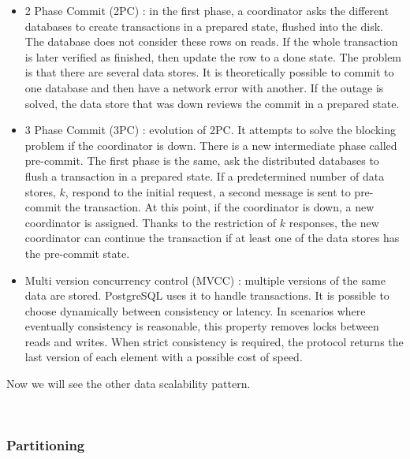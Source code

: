 \documentclass[12pt,english]{article} %
\begin{document}
\begin{itemize}
    \item 2 Phase Commit (2PC) \cite{distributed-transactions-2pc}: in the first phase, a coordinator asks the different databases to create transactions in a prepared state, flushed into the disk.
    The database does not consider these rows on reads.
    If the whole transaction is later verified as finished, then update the row to a done state.
    The problem is that there are several data stores.
    It is theoretically possible to commit to one database and then have a network error with another.
    If the outage is solved, the data store that was down reviews the commit in a prepared state.
    \item 3 Phase Commit (3PC) \cite{distributed-transactions-3pc}: evolution of 2PC. It attempts to solve the blocking problem if the coordinator is down.
    There is a new intermediate phase called pre-commit.
    The first phase is the same, ask the distributed databases to flush a transaction in a prepared state.
    If a predetermined number of data stores, $k$, respond to the initial request, a second message is sent to pre-commit the transaction.
    At this point, if the coordinator is down, a new coordinator is assigned.
    Thanks to the restriction of $k$ responses, the new coordinator can continue the transaction if at least one of the data stores has the pre-commit state.
    \item Multi version concurrency control (MVCC) \cite{distributed-consensus-data-replication}: multiple versions of the same data are stored.
    PostgreSQL uses it to handle transactions.
    It is possible to choose dynamically between consistency or latency.
    In scenarios where eventually consistency is reasonable, this property removes locks between reads and writes.
    When strict consistency is required, the protocol returns the last version of each element with a possible cost of speed. 
\end{itemize}

Now we will see the other data scalability pattern.

\


\subsubsection{Partitioning}
\end{document}
